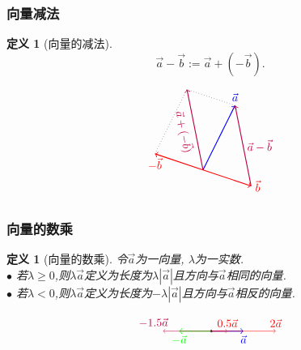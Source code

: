 \documentclass{article}
\newtheorem{definition}[theorem]{定义}
\begin{document}
\subsubsection{向量减法}
\begin{definition}[向量的减法]
\[\vec{a}-\vec{b}:=\vec{a}+(-\vec{b}).\]
\end{definition}
\begin{equation*}
\begin{tikzpicture}[scale=1]
\coordinate (O) at (0,0);
\coordinate (A) at (1,2);
\coordinate (B) at (1.5,-0.5);
\coordinate (b) at (-1.5,0.5);
\coordinate (C) at (-0.5,2.5);
\draw[->,thick,blue](O)--(A) node[pos=1,above] {$\vec{a}$};
\draw[->,thick,red](O)--(B) node[pos=1,right] {$\vec{b}$};
\draw[->,thick,red](O)--(b) node[pos=1,below] {$-\vec{b}$};
\draw[dotted](A)--(C)--(b);
\draw[->,thick,purple](O)--(C) node[pos=0.5,sloped,below] {$\vec{a}+(-\vec{b})$};
\draw[->,thick,purple](B)--(A) node[pos=0.5,right] {$\vec{a}-\vec{b}$};
\end{tikzpicture}
\end{equation*}

\subsubsection{向量的数乘}
\begin{definition}[向量的数乘] 令$\vec{a}$为一向量, $\lambda$为一实数.\\
$\bullet$ 若$\lambda\geq0$,则$\lambda \vec{a}$定义为长度为$\lambda |\vec{a}|$且方向与$\vec{a}$相同的向量.\\
$\bullet$ 若$\lambda<0$,则$\lambda \vec{a}$定义为长度为$-\lambda |\vec{a}|$且方向与$\vec{a}$相反的向量.
\end{definition}
\begin{equation*}
\begin{tikzpicture}[scale=1]
\coordinate (O) at (0,0);\draw [fill] (O) circle [radius=0.03];
\coordinate (A) at (1,0);
\coordinate (05A) at (0.5*1,0);
\coordinate (2A) at (2*1,0);
\coordinate (mA) at (-1*1,0);
\coordinate (m15A) at (-1.5*1,0);
\coordinate (B) at (-1,1);
\coordinate (mpiB) at (3.14,-3.14);
\coordinate (eB) at (-2.718,2.718);
\draw[->,thick,blue](O)--(A) node[pos=1,sloped,below] {$\vec{a}$};
\draw[->,red](O)--(05A) node[pos=1,sloped,above] {$0.5\vec{a}$};
\draw[->,red](O)--(2A) node[pos=1,sloped,above] {$2\vec{a}$};
\draw[->,thick,green](O)--(mA) node[pos=1,sloped,below] {$-\vec{a}$};
\draw[->,purple](O)--(m15A) node[pos=1.2,sloped,above] {$-1.5\vec{a}$};
\end{tikzpicture}
\end{equation*}
\end{document}
